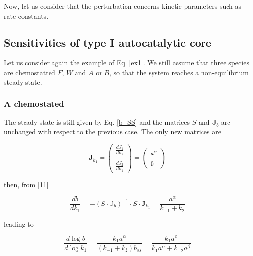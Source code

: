 \documentclass{article}
\begin{document}
	Now, let us consider that the perturbation concerns kinetic parameters such as rate constants.
	
	\subsection{Sensitivities of type I autocatalytic core}
	Let us consider again the example of Eq. \ref{ex1}. We still assume that three species are chemostatted $F$, $W$ and $A$ or $B$, so that the system reaches a non-equilibrium steady state.
	
	\subsubsection{A chemostated}
	The steady state is still given by Eq. \ref{b_SS} and 
	the matrices $S$ and $\mathbb{J}_b$ are unchanged with respect to the previous case. The only new matrices are 
	
	\begin{center}
		\begin{equation}
			\mathbf{J}_{k_1} = \begin{pmatrix}
				\frac{d J_1}{d k_1} \\ \\
				\frac{d J_2}{d k_1}
			\end{pmatrix}= \begin{pmatrix}
				a^{\alpha} \\ \\
				0
			\end{pmatrix}
			\label{53}
		\end{equation}
	\end{center}
	
	then, from \eqref{11}
	
	\begin{center}
		\begin{equation}
			\frac{d b}{d k_1} = - \left( S \cdot {\mathbb{J}}_{b} \right)^ {-1} \cdot S \cdot \mathbf{J}_{k_1} = \frac{a^{\alpha}}{k_{-1}+k_2}
		\end{equation}
	\end{center}
	
	leading to
	
	\begin{center}
		\begin{equation}
			\frac{d \log b}{d \log k_1} =  \frac{k_1 a^{\alpha}}{(k_{-1}+k_2)b_{ss}} = \frac{k_1 a^{\alpha}}{k_{1}a^{\alpha}+k_{-2}a^{\beta}}
		\end{equation}
	\end{center}
	
\end{document}
